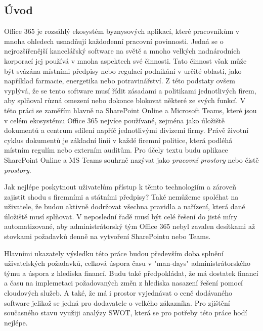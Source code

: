 \documentclass[12pt]{article}
\begin{document}
\begin{sloppypar}
\begin{spacing}{1.15}
		\section*{Úvod}
	    Office 365 je rozsáhlý ekosystém byznysových aplikací, které pracovníkům
        v mnoha ohledech usnadňují každodenní pracovní povinnosti. Jedná se o 
        nejrozšířenější kancelářský software na světě a mnoho velkých 
        nadnárodních korporací jej používá v mnoha aspektech své činnosti. 
        Tato činnost však může být svázána místními předpisy nebo regulací 
        podnikání v určité oblasti, jako například farmacie, energetika nebo 
        potravinářství. Z této podstaty ovšem vyplývá, že se tento software musí
        řídit zásadami a politikami jednotlivých firem, aby splňoval různá 
        omezení nebo dokonce blokovat některé ze svých funkcí. V této práci se 
        zaměřím hlavně na SharePoint Online a Microsoft Teams, které jsou v celém 
        ekosystému Office 365 nejvíce používané, zejména jako úložiště dokumentů 
        a centrum sdílení napříč jednotlivými divizemi firmy. Právě životní 
        cyklus dokumentů je základní linií v každé firemní politice, která 
        podléhá místním regulím nebo externím auditům. Pro účely textu
        budu aplikace SharePoint Online a MS Teams souhrně nazývat jako
        \textit{pracovní prostory} nebo čistě \textit{prostory}. 

        Jak nejlépe poskytnout uživatelům přístup k těmto technologiím a zároveň 
        zajistit shodu s firemními a státními předpisy? Také nemůžeme spoléhat na 
        uživatele, že budou aktivně dodržovat všechna pravidla a nařízení, která 
        dané úložiště musí splňovat. V neposlední řadě musí být celé řešení do 
        jisté míry automatizované, aby administrátorský tým Office 365 nebyl 
        zavalen desítkami až stovkami požadavků denně na vytvoření SharePointu 
        nebo Teams.
        
        Hlavními ukazately výsledku této práce budou především doba splnění 
        uživatelských požadavků, celková úspora času v "man-days" administrátorského 
        týmu a úspora z hlediska financí. Budu také předpokládat, že má dostatek
        financí a času na implemetaci požadovaných změn z hlediska nasazení řešení
        pomocí cloudových služeb. A také, že má i prostor vyjednávat o ceně dodávaného
        software jelikož se jedná pro dodavatele o velkého zákazníka. Pro
        zjištění současného stavu využiji analýzy SWOT, která se pro potřeby
        této práce hodí nejlépe.
        

\end{spacing}
\end{sloppypar}
\end{document}

